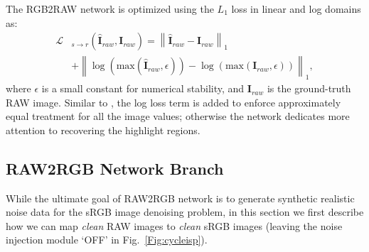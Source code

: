 \documentclass[10pt,twocolumn,letterpaper]{article}
\begin{document}
The RGB2RAW network is optimized using the $L_1$ loss in linear and log domains as:
\begin{equation}
\label{Eq:loss rgb2raw}
\begin{split}
\mathcal{L}&_{{s\rightarrow r}}(\hat{\mathbf{I}}_{raw},\mathbf{I}_{raw})
=
\left \| \hat{\mathbf{I}}_{raw} - \mathbf{I}_{raw}  \right \|_{1} 
\\
&
+ \left \| \log(\text{max}(\hat{\mathbf{I}}_{raw},\epsilon)) - \log(\text{max}(\mathbf{I}_{raw},\epsilon))\right \|_{1} ,
\end{split}
\end{equation}
where $\epsilon$ is a small constant for numerical stability, and $\mathbf{I}_{raw}$ is the ground-truth RAW image. 
Similar to \cite{eilertsen2017hdr}, the log loss term is added to enforce approximately equal treatment for all the image values; otherwise the network dedicates more attention to recovering the highlight regions.

\subsection{RAW2RGB Network Branch}
While the ultimate goal of RAW2RGB network is to  generate synthetic realistic noise data for the sRGB image denoising problem, in this section we first describe how we can map \emph{clean} RAW images to \emph{clean} sRGB images (leaving the noise injection module `OFF' in Fig.~\ref{Fig:cycleisp}).
\end{document}

